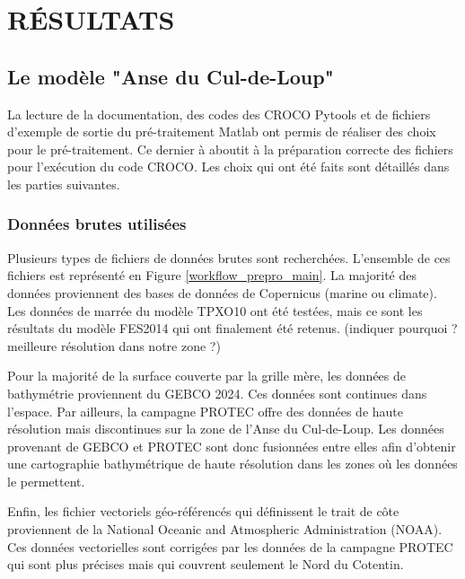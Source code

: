 \documentclass[10pt,a4paper,titlepage]{article}
\begin{document}
\newpage
\section{RÉSULTATS}

\subsection{Le modèle "Anse du Cul-de-Loup"}

La lecture de la documentation, des codes des CROCO Pytools et de fichiers d'exemple de sortie du pré-traitement Matlab ont permis de réaliser des choix pour le pré-traitement.
Ce dernier à aboutit à la préparation correcte des fichiers pour l'exécution du code CROCO.
Les choix qui ont été faits sont détaillés dans les parties suivantes.

\subsubsection{Données brutes utilisées}
Plusieurs types de fichiers de données brutes sont recherchées. L'ensemble de ces fichiers est représenté en Figure \ref{workflow_prepro_main}.
La majorité des données proviennent des bases de données de Copernicus (marine ou climate).
Les données de marrée du modèle TPXO10 ont été testées, mais ce sont les résultats du modèle FES2014 qui ont finalement été retenus. (indiquer pourquoi ? meilleure résolution dans notre zone ?)

Pour la majorité de la surface couverte par la grille mère, les données de bathymétrie proviennent du GEBCO 2024.
Ces données sont continues dans l'espace.
Par ailleurs, la campagne PROTEC offre des données de haute résolution mais discontinues sur la zone de l'Anse du Cul-de-Loup.
Les données provenant de GEBCO et PROTEC sont donc fusionnées entre elles afin d'obtenir une cartographie bathymétrique de haute résolution dans les zones où les données le permettent.

Enfin, les fichier vectoriels géo-référencés qui définissent le trait de côte proviennent de la National Oceanic and Atmospheric Administration (NOAA).
Ces données vectorielles sont corrigées par les données de la campagne PROTEC qui sont plus précises mais qui couvrent seulement le Nord du Cotentin.
\end{document}
